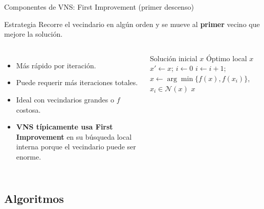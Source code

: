 \documentclass[aspectratio=169, 11pt, xcolor={dvipsnames,table}]{beamer}
\begin{document}
\begin{frame}{Componentes de VNS: First Improvement (primer descenso)}
\begin{block}{Estrategia}
Recorre el vecindario en algún orden y se mueve al \textbf{primer} vecino que
mejore la solución.
\end{block}

\begin{columns}[T]
\begin{itemize}
  \item Más rápido por iteración.
  \item Puede requerir más iteraciones totales.
  \item Ideal con vecindarios grandes o $f$ costosa.
  \item \textbf{VNS típicamente usa First Improvement} en su búsqueda local interna
porque el vecindario puede ser enorme.
\end{itemize}

\vspace{-15pt}
\scriptsize
\begin{algorithm}[H]
\caption{First Improvement}
\begin{algorithmic}[1]
\Require Solución inicial $x$
\Ensure Óptimo local $x$
\Repeat
  \State $x' \gets x$; $i \gets 0$
  \Repeat
    \State $i \gets i + 1$;
    \State $x \gets \arg\min\{f(x), f(x_i)\}$, \; $x_i \in \mathcal{N}(x)$
\Return $x$
\end{algorithmic}
\end{algorithm}
\end{columns}
\end{frame}


\subsection{Algoritmos}

\end{document}
